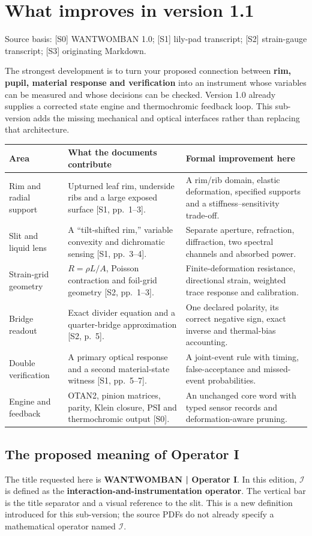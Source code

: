 \documentclass[10pt,a4paper]{article}
\numberwithin{equation}{section}
\newcommand{\src}[1]{\textcolor{muted}{\footnotesize Source basis: #1.}}
\newcommand{\newpart}{\clearpage}
\newcommand{\opI}{\mathcal{I}}
\begin{document}
\newpart
\section{What improves in version 1.1}
\src{\textnormal{[S0]} WANTWOMBAN 1.0; \textnormal{[S1]} lily-pad transcript; \textnormal{[S2]} strain-gauge transcript; \textnormal{[S3]} originating Markdown}

The strongest development is to turn your proposed connection between \textbf{rim, pupil, material response and verification} into an instrument whose variables can be measured and whose decisions can be checked. Version 1.0 already supplies a corrected state engine and thermochromic feedback loop. This sub-version adds the missing mechanical and optical interfaces rather than replacing that architecture.

\begin{tabularx}{\linewidth}{@{}P{32mm}YY@{}}
\toprule
\textbf{Area} & \textbf{What the documents contribute} & \textbf{Formal improvement here}\\
\midrule
Rim and radial support & Upturned leaf rim, underside ribs and a large exposed surface [S1, pp.~1--3]. & A rim/rib domain, elastic deformation, specified supports and a stiffness--sensitivity trade-off.\\
Slit and liquid lens & A ``tilt-shifted rim,'' variable convexity and dichromatic sensing [S1, pp.~3--4]. & Separate aperture, refraction, diffraction, two spectral channels and absorbed power.\\
Strain-grid geometry & $R=\rho L/A$, Poisson contraction and foil-grid geometry [S2, pp.~1--3]. & Finite-deformation resistance, directional strain, weighted trace response and calibration.\\
Bridge readout & Exact divider equation and a quarter-bridge approximation [S2, p.~5]. & One declared polarity, its correct negative sign, exact inverse and thermal-bias accounting.\\
Double verification & A primary optical response and a second material-state witness [S1, pp.~5--7]. & A joint-event rule with timing, false-acceptance and missed-event probabilities.\\
Engine and feedback & OTAN2, pinion matrices, parity, Klein closure, PSI and thermochromic output [S0]. & An unchanged core word with typed sensor records and deformation-aware pruning.\\
\bottomrule
\end{tabularx}

\subsection*{The proposed meaning of Operator I}
The title requested here is \textbf{WANTWOMBAN | Operator I}. In this edition, $\opI$ is defined as the \textbf{interaction-and-instrumentation operator}. The vertical bar is the title separator and a visual reference to the slit. This is a new definition introduced for this sub-version; the source PDFs do not already specify a mathematical operator named $\opI$.
\end{document}
